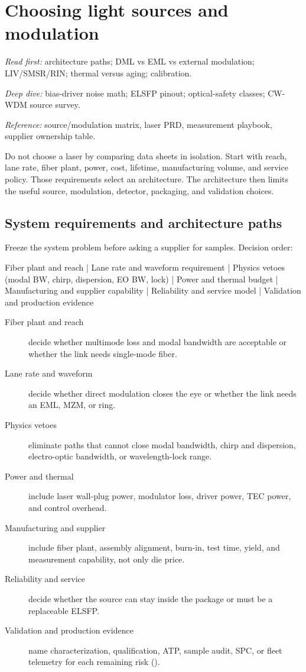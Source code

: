 \chapter{Choosing light sources and modulation}
\label{ch:lasers}

\textit{Read first:} architecture paths; DML vs EML vs external modulation;
LIV/SMSR/RIN; thermal versus aging; calibration.

\textit{Deep dive:} bias-driver noise math; ELSFP pinout; optical-safety classes;
CW-WDM source survey.

\textit{Reference:} source/modulation matrix, laser PRD, measurement playbook,
supplier ownership table.

Do not choose a laser by comparing data sheets in isolation. Start with reach,
lane rate, fiber plant, power, cost, lifetime, manufacturing volume, and service
policy. Those requirements select an architecture. The architecture then limits
the useful source, modulation, detector, packaging, and validation choices.

\section{System requirements and architecture paths}
\label{sec:laser-system-requirements}

Freeze the system problem before asking a supplier for samples. Decision order:

\begin{dectree}
Fiber plant and reach
  |
Lane rate and waveform requirement
  |
Physics vetoes (modal BW, chirp, dispersion, EO BW, lock)
  |
Power and thermal budget
  |
Manufacturing and supplier capability
  |
Reliability and service model
  |
Validation and production evidence
\end{dectree}

\begin{description}
\item[Fiber plant and reach] decide whether multimode loss and modal bandwidth are
      acceptable or whether the link needs single-mode fiber.
\item[Lane rate and waveform] decide whether direct modulation closes the eye or
      whether the link needs an EML, MZM, or ring.
\item[Physics vetoes] eliminate paths that cannot close modal bandwidth, chirp
      and dispersion, electro-optic bandwidth, or wavelength-lock range.
\item[Power and thermal] include laser wall-plug power, modulator loss, driver
      power, TEC power, and control overhead.
\item[Manufacturing and supplier] include fiber plant, assembly alignment, burn-in,
      test time, yield, and measurement capability, not only die price.
\item[Reliability and service] decide whether the source can stay inside the
      package or must be a replaceable ELSFP.
\item[Validation and production evidence] name characterization, qualification,
      ATP, sample audit, SPC, or fleet telemetry for each remaining risk
      ().
\end{description}

